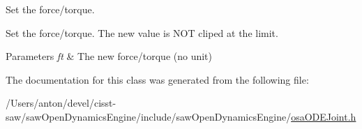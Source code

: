 Set the force/torque. 

Set the force/torque. The new value is N\+O\+T cliped at the limit. 
\begin{DoxyParams}{Parameters}
{\em ft} & The new force/torque (no unit) \\
\hline
\end{DoxyParams}


The documentation for this class was generated from the following file\+:\begin{DoxyCompactItemize}
\item 
/\+Users/anton/devel/cisst-\/saw/saw\+Open\+Dynamics\+Engine/include/saw\+Open\+Dynamics\+Engine/\hyperlink{osa_o_d_e_joint_8h}{osa\+O\+D\+E\+Joint.\+h}\end{DoxyCompactItemize}
